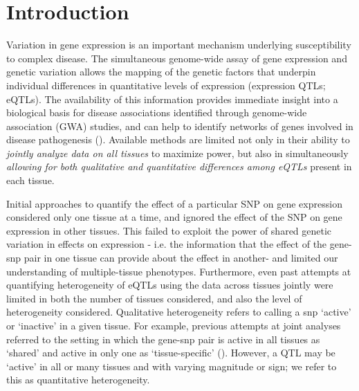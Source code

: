 \section*{Introduction}
Variation in gene expression is an important mechanism underlying susceptibility to complex disease. The simultaneous genome-wide assay of gene expression and genetic variation allows the mapping of the genetic factors that underpin individual differences in quantitative levels of expression (expression QTLs; eQTLs). 
The availability of this information provides immediate insight into a biological basis for disease associations identified through genome-wide association (GWA) studies, and can help to identify networks of genes 
involved in disease pathogenesis (\cite{nicolae_trait-associated_2010, veyrieras_high-resolution_2008}).
Available methods are limited not only in their ability to {\it jointly analyze data on all tissues} to maximize power, but also in simultaneously {\it allowing for both qualitative and quantitative differences among eQTLs} present in each tissue.

Initial approaches to quantify the effect of a particular SNP on gene expression considered only one tissue at a time, and ignored the effect of the SNP on gene expression in other tissues.
This failed to exploit the power of shared genetic variation in effects on expression - i.e. the information that the effect of the gene-snp pair in one tissue can provide about the effect in another- and limited our understanding of multiple-tissue phenotypes.
Furthermore, even past attempts at quantifying heterogeneity of eQTLs using the data across tissues jointly were limited in both the number of tissues considered, and also the level of heterogeneity considered. Qualitative heterogeneity refers to calling a snp `active' or `inactive' in a given tissue. For example, previous attempts at joint analyses referred to the setting in which the gene-snp pair is active in all tissues as `shared' and active in only one as `tissue-specific'  (\cite{flutre_statistical_2013,wen_bayesian_2014}).
However, a QTL may be `active' in all or many tissues and with varying magnitude or sign; we refer to this as quantitative heterogeneity.

